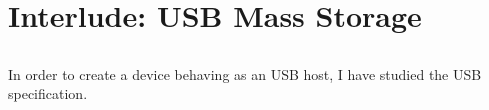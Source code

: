 \chapter{Interlude: USB Mass Storage}
    \section{}
    In order to create a device behaving as an USB host, I have studied the USB specification.
    
    

